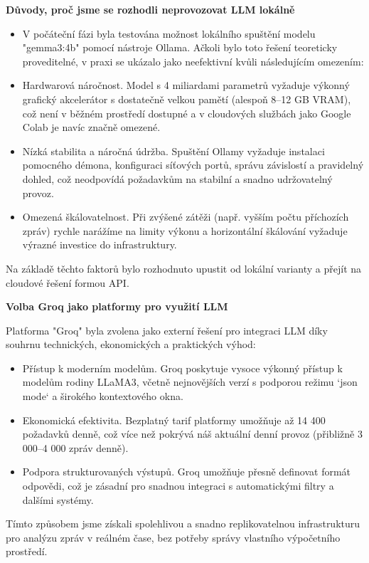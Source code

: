 \documentclass[FM,Proj]{tulthesis}
\begin{document}
\textbf{Důvody, proč jsme se rozhodli neprovozovat LLM lokálně}

\begin{itemize}
    \item V počáteční fázi byla testována možnost lokálního spuštění modelu "gemma3:4b" pomocí nástroje Ollama. Ačkoli bylo toto řešení teoreticky proveditelné, v praxi se ukázalo jako neefektivní kvůli následujícím omezením:
    \item Hardwarová náročnost. Model s 4 miliardami parametrů vyžaduje výkonný grafický akcelerátor s dostatečně velkou pamětí (alespoň 8–12 GB VRAM), což není v běžném prostředí dostupné a v cloudových službách jako Google Colab je navíc značně omezené.
    \item Nízká stabilita a náročná údržba. Spuštění Ollamy vyžaduje instalaci pomocného démona, konfiguraci síťových portů, správu závislostí a pravidelný dohled, což neodpovídá požadavkům na stabilní a snadno udržovatelný provoz.
    \item Omezená škálovatelnost. Při zvýšené zátěži (např. vyšším počtu příchozích zpráv) rychle narážíme na limity výkonu a horizontální škálování vyžaduje výrazné investice do infrastruktury.
\end{itemize}
    
Na základě těchto faktorů bylo rozhodnuto upustit od lokální varianty a přejít na cloudové řešení formou API.

\textbf{Volba Groq jako platformy pro využití LLM}

Platforma "Groq" byla zvolena jako externí řešení pro integraci LLM díky souhrnu technických, ekonomických a praktických výhod:

\begin{itemize}
    \item Přístup k moderním modelům. Groq poskytuje vysoce výkonný přístup k modelům rodiny LLaMA3, včetně nejnovějších verzí s podporou režimu `json mode` a širokého kontextového okna.
    \item Ekonomická efektivita. Bezplatný tarif platformy umožňuje až 14 400 požadavků denně, což více než pokrývá náš aktuální denní provoz (přibližně 3 000–4 000 zpráv denně).
    \item Podpora strukturovaných výstupů. Groq umožňuje přesně definovat formát odpovědi, což je zásadní pro snadnou integraci s automatickými filtry a dalšími systémy.
\end{itemize}
    
Tímto způsobem jsme získali spolehlivou a snadno replikovatelnou infrastrukturu pro analýzu zpráv v reálném čase, bez potřeby správy vlastního výpočetního prostředí.
\end{document}
